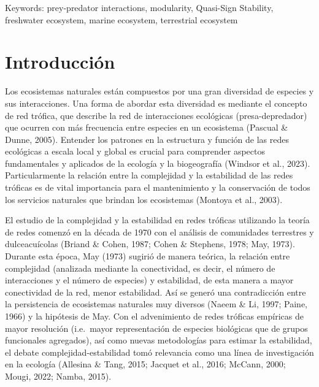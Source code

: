 \documentclass[
]{article}
\begin{document}
Keywords: prey-predator interactions, modularity, Quasi-Sign Stability,
freshwater ecosystem, marine ecosystem, terrestrial ecosystem

\newpage

\hypertarget{introducciuxf3n}{%
\section{Introducción}\label{introducciuxf3n}}

Los ecosistemas naturales están compuestos por una gran diversidad de
especies y sus interacciones. Una forma de abordar esta diversidad es
mediante el concepto de red trófica, que describe la red de
interacciones ecológicas (presa-depredador) que ocurren con más
frecuencia entre especies en un ecosistema (Pascual \& Dunne, 2005).
Entender los patrones en la estructura y función de las redes ecológicas
a escala local y global es crucial para comprender aspectos
fundamentales y aplicados de la ecología y la biogeografía (Windsor et
al., 2023). Particularmente la relación entre la complejidad y la
estabilidad de las redes tróficas es de vital importancia para el
mantenimiento y la conservación de todos los servicios naturales que
brindan los ecosistemas (Montoya et al., 2003).

El estudio de la complejidad y la estabilidad en redes tróficas
utilizando la teoría de redes comenzó en la década de 1970 con el
análisis de comunidades terrestres y dulceacuícolas (Briand \& Cohen,
1987; Cohen \& Stephens, 1978; May, 1973). Durante esta época, May
(1973) sugirió de manera teórica, la relación entre complejidad
(analizada mediante la conectividad, es decir, el número de
interacciones y el número de especies) y estabilidad, de esta manera a
mayor conectividad de la red, menor estabilidad. Así se generó una
contradicción entre la persistencia de ecosistemas naturales muy
diversos (Naeem \& Li, 1997; Paine, 1966) y la hipótesis de May. Con el
advenimiento de redes tróficas empíricas de mayor resolución (i.e.~mayor
representación de especies biológicas que de grupos funcionales
agregados), así como nuevas metodologías para estimar la estabilidad, el
debate complejidad-estabilidad tomó relevancia como una línea de
investigación en la ecología (Allesina \& Tang, 2015; Jacquet et al.,
2016; McCann, 2000; Mougi, 2022; Namba, 2015).
\end{document}
